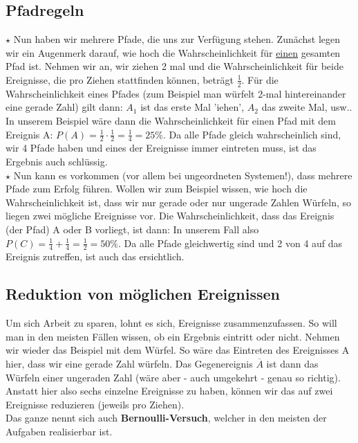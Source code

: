 	\subsection{Pfadregeln}
		\(\star\) Nun haben wir mehrere Pfade, die uns zur Verfügung stehen. Zunächst
		legen wir ein Augenmerk darauf, wie hoch die Wahrscheinlichkeit für
		\underline{einen} gesamten Pfad ist. Nehmen wir an, wir ziehen 2 mal und die
		Wahrscheinlichkeit für beide Ereignisse, die pro Ziehen stattfinden können,
		beträgt \(\frac{1}{2}\). Für die Wahrscheinlichkeit eines Pfades (zum Beispiel
		man würfelt 2-mal hintereinander eine gerade Zahl) gilt dann:
		\formel{\[P(A)=P(A_1) \cdot P(A_2) \cdot \ldots\]}
		\(A_1\) ist das erste Mal 'iehen', \(A_2\) das zweite Mal, usw.. In unserem
		Beispiel wäre dann die Wahrscheinlichkeit für einen Pfad mit dem Ereignis A:
		\(P(A)=\frac{1}{2} \cdot \frac{1}{2}=\frac{1}{4}=25\%\). Da alle Pfade gleich
		wahrscheinlich sind, wir 4 Pfade haben und eines der Ereignisse immer
		eintreten muss, ist das Ergebnis auch schlüssig.\\
		\(\star\) Nun kann es vorkommen (vor allem bei ungeordneten Systemen!), dass
		mehrere Pfade zum Erfolg führen. Wollen wir zum Beispiel wissen, wie hoch die
		Wahrscheinlichkeit ist, dass wir nur gerade oder nur ungerade Zahlen Würfeln,
		so liegen zwei mögliche Ereignisse vor. Die Wahrscheinlichkeit, dass das
		Ereignis (der Pfad) A oder B vorliegt, ist dann:
		\formel{\[P(A\cup B)=P(A)+P(B)\]}
		In unserem Fall also \(P(C)=\frac{1}{4}+\frac{1}{4}=\frac{1}{2}=50\%\). Da
		alle Pfade gleichwertig sind und 2 von 4 auf das Ereignis zutreffen, ist auch
		das ersichtlich.

	\subsection{Reduktion von möglichen Ereignissen}
		Um sich Arbeit zu sparen, lohnt es sich, Ereignisse zusammenzufassen. So will
		man in den meisten Fällen wissen, ob ein Ergebnis eintritt oder nicht.
		Nehmen wir wieder das Beispiel mit dem Würfel. So wäre das Eintreten des
		Ereignisses A hier, dass wir eine gerade Zahl würfeln. Das Gegenereignis
		\(\overline{A}\) ist dann das Würfeln einer ungeraden Zahl (wäre aber - auch
		umgekehrt - genau so richtig). Anstatt hier also sechs einzelne Ereignisse zu
		haben, können wir das auf zwei Ereignisse reduzieren (jeweils pro Ziehen).\\
		Das ganze nennt sich auch \textbf{Bernoulli-Versuch}, welcher in den meisten
		der Aufgaben realisierbar ist.
